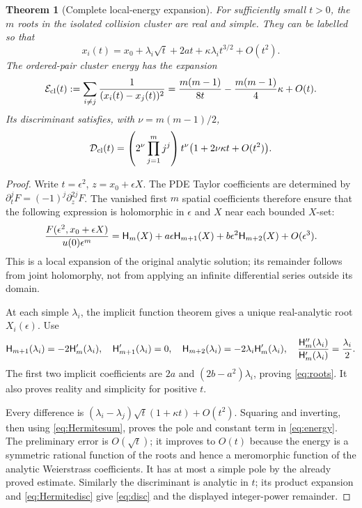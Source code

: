 \documentclass[11pt,a4paper]{article}
\newtheorem{theorem}{Theorem}[section]
\theoremstyle{definition}
\begin{document}
\begin{theorem}[Complete local-energy expansion]\label{thm:finitepart}
For sufficiently small $t>0$, the $m$ roots in the isolated collision cluster are real and simple. They can be labelled so that
\begin{equation}\label{eq:roots}
 x_i(t)=x_0+\lambda_i\sqrt t+2at+
 \kappa\lambda_i t^{3/2}+O(t^2).
\end{equation}
The ordered-pair cluster energy has the expansion
\begin{equation}\label{eq:energy}
 \mathcal E_{\rm cl}(t):=
 \sum_{i\ne j}\frac1{(x_i(t)-x_j(t))^2}
 =\frac{m(m-1)}{8t}
 -\frac{m(m-1)}4\kappa+O(t).
\end{equation}
Its discriminant satisfies, with $\nu=m(m-1)/2$,
\begin{equation}\label{eq:disc}
 \mathcal D_{\rm cl}(t)=
 \left(2^\nu\prod_{j=1}^m j^j\right)t^\nu
 \bigl(1+2\nu\kappa t+O(t^2)\bigr).
\end{equation}
\end{theorem}
\begin{proof}
Write $t=\epsilon^2$, $z=x_0+\epsilon X$. The PDE Taylor coefficients are determined by
$\partial_t^jF=(-1)^j\partial_z^{2j}F$. The vanished first $m$ spatial coefficients therefore ensure that the following expression is holomorphic in $\epsilon$ and $X$ near each bounded $X$-set:
\[
 \frac{F(\epsilon^2,x_0+\epsilon X)}{u(0)\epsilon^m}
 =\mathsf H_m(X)+a\epsilon\mathsf H_{m+1}(X)
 +b\epsilon^2\mathsf H_{m+2}(X)+O(\epsilon^3).
\]
This is a local expansion of the original analytic solution; its remainder follows from joint holomorphy, not from applying an infinite differential series outside its domain.

At each simple $\lambda_i$, the implicit function theorem gives a unique real-analytic root $X_i(\epsilon)$. Use
\[
 \mathsf H_{m+1}(\lambda_i)=-2\mathsf H_m'(\lambda_i),\quad
 \mathsf H_{m+1}'(\lambda_i)=0,\quad
 \mathsf H_{m+2}(\lambda_i)=-2\lambda_i\mathsf H_m'(\lambda_i),\quad
 \frac{\mathsf H_m''(\lambda_i)}{\mathsf H_m'(\lambda_i)}=\frac{\lambda_i}{2}.
\]
The first two implicit coefficients are $2a$ and $(2b-a^2)\lambda_i$, proving \eqref{eq:roots}. It also proves reality and simplicity for positive $t$.

Every difference is
$(\lambda_i-\lambda_j)\sqrt t(1+\kappa t)+O(t^2)$.
Squaring and inverting, then using \eqref{eq:Hermitesum}, proves the pole and constant term in \eqref{eq:energy}. The preliminary error is $O(\sqrt t)$; it improves to $O(t)$ because the energy is a symmetric rational function of the roots and hence a meromorphic function of the analytic Weierstrass coefficients. It has at most a simple pole by the already proved estimate. Similarly the discriminant is analytic in $t$; its product expansion and \eqref{eq:Hermitedisc} give \eqref{eq:disc} and the displayed integer-power remainder.
\end{proof}
\end{document}
